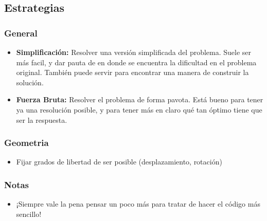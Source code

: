 
\subsection{Estrategias}

\subsubsection*{General}
\begin{itemize}
    \item \textbf{Simplificación:} Resolver una versión simplificada del problema. Suele ser más facil, y dar pauta de en donde se encuentra la dificultad en el problema original. También puede servir para encontrar una manera de construir la solución.
    \item \textbf{Fuerza Bruta:} Resolver el problema de forma pavota. Está bueno para tener ya una resolución posible, y para tener más en claro qué tan óptimo tiene que ser la respuesta.
\end{itemize}

\subsubsection*{Geometria}
\begin{itemize}
    \item Fijar grados de libertad de ser posible (desplazamiento, rotación)
\end{itemize}


\subsubsection*{Notas}
\begin{itemize}
    \item ¡Siempre vale la pena pensar un poco más para tratar de hacer el código más sencillo!
\end{itemize}
